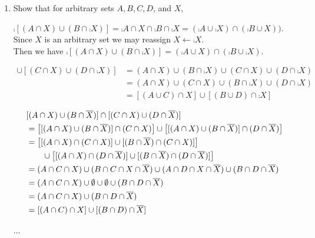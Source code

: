 \documentclass[12pt]{book}
\begin{document}
\begin{enumerate}
\item Show that for arbitrary sets $A, B, C, D$, and $X$,
\begin{enumerate}
{$\comp{[(A \cap X) \cup (B \cap \comp{X})]} = \comp{A \cap X} \cap \comp{B \cap \comp{X}} = (\comp{A} \cup \comp{X}) \cap (\comp{B} \cup X))$.\\Since $X$ is an arbitrary set we may reassign $X \leftarrow \comp{X}$.\\Then we have $\comp{[(A \cap X) \cup (B \cap \comp{X})]} = (\comp{A} \cup X) \cap (\comp{B} \cup \comp{X})$.}

{\begin{align*}[(A \cap X) \cup (B \cap \comp{X})] \cup [(C \cap X) \cup (D \cap \comp{X})] &= (A \cap X) \cup (B \cap \comp{X}) \cup (C \cap X) \cup (D \cap \comp{X})\\&= (A \cap X) \cup (C \cap X) \cup (B \cap \comp{X}) \cup (D \cap \comp{X})\\&= [(A \cup C) \cap X] \cup [(B \cup D) \cap \comp{X}]\end{align*}}

{\begin{align*}&[(A \cap X) \cup (B \cap \overline{X})] \cap [(C \cap X) \cup (D \cap \overline{X})]\\ &= \left[[(A \cap X) \cup (B \cap \overline{X})] \cap (C \cap X)\right] \cup \left[[(A \cap X) \cup (B \cap \overline{X})] \cap (D \cap \overline{X})\right]\\&= \left[[(A \cap X) \cap (C \cap X)] \cup [(B \cap \overline{X}) \cap (C \cap X)]\right]\\&\hspace{0.7cm}\cup \left[[(A \cap X) \cap (D \cap \overline{X})] \cup [(B \cap \overline{X}) \cap (D \cap \overline{X})]\right] \\&= (A \cap C \cap X) \cup (B \cap C \cap X \cap \overline{X}) \cup (A \cap D \cap X \cap \overline{X}) \cup (B \cap D \cap \overline{X})\\&= (A \cap C \cap X) \cup \emptyset \cup \emptyset \cup (B \cap D \cap \overline{X}) \\&= (A \cap C \cap X) \cup (B \cap D \cap \overline{X}) \\&= [(A \cap C) \cap X] \cup [(B \cap D) \cap \overline{X}] \end{align*}}
\end{enumerate}

{...}

\hrulefill


\end{enumerate}
\end{document}
